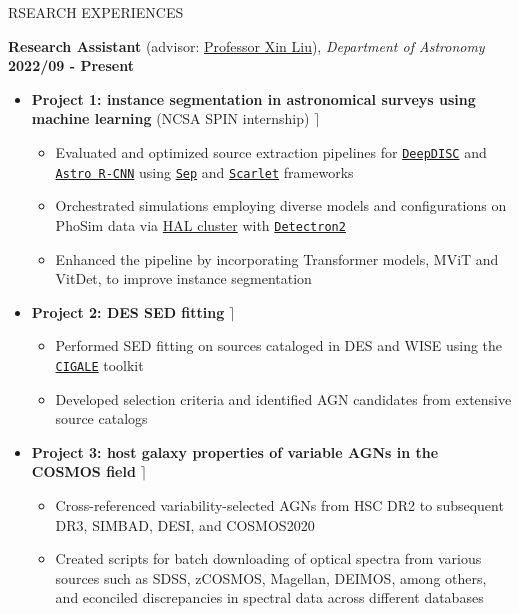 \documentclass[10pt]{article} %
\begin{document}
\begin{section}{RSEARCH EXPERIENCES}

\textbf{Research Assistant} (advisor: \href{mailto:xinliuxl@illinois.edu}{Professor Xin Liu}), \textit{Department of Astronomy} \hfill \textbf{2022/09 - Present} 
\begin{itemize}[leftmargin=1.5em]
    \item \textbf{Project 1: instance segmentation in astronomical surveys using machine learning} (NCSA SPIN internship) \hfill $\rceil$ %
    \begin{itemize}[leftmargin=1.5em]
        \item Evaluated and optimized source extraction pipelines for \href{https://github.com/burke86/deepdisc}{\texttt{DeepDISC}} and \href{https://github.com/burke86/astro_rcnn}{\texttt{Astro R-CNN}} using \href{https://github.com/kbarbary/sep/tree/v1.1.x}{\texttt{Sep}} and \href{https://github.com/pmelchior/scarlet}{\texttt{Scarlet}} frameworks
        \item Orchestrated simulations employing diverse models and configurations on PhoSim data via \href{https://www.ncsa.illinois.edu/research/project-highlights/hal-cluster/}{HAL cluster} with \href{https://github.com/facebookresearch/detectron2}{\texttt{Detectron2}}
        \item Enhanced the pipeline by incorporating Transformer models, MViT and VitDet, to improve instance segmentation
    \end{itemize}
    \item \textbf{Project 2: DES SED fitting} \hfill $\rceil$ %
    \begin{itemize}[leftmargin=1.5em]
        \item Performed SED fitting on sources cataloged in DES and WISE using the \href{https://cigale.lam.fr/}{\texttt{CIGALE}} toolkit
        \item Developed selection criteria and identified AGN candidates from extensive source catalogs
    \end{itemize}
    \item \textbf{Project 3: host galaxy properties of variable AGNs in the COSMOS field} \hfill $\rceil$ %
    \begin{itemize}[leftmargin=1.5em]
        \item Cross-referenced variability-selected AGNs from HSC DR2 to subsequent DR3, SIMBAD, DESI, and COSMOS2020
        \item Created scripts for batch downloading of optical spectra from various sources such as SDSS, zCOSMOS, Magellan, DEIMOS, among others, and econciled discrepancies in spectral data across different databases

\end{itemize}
\end{itemize}
\end{section}
\end{document}
